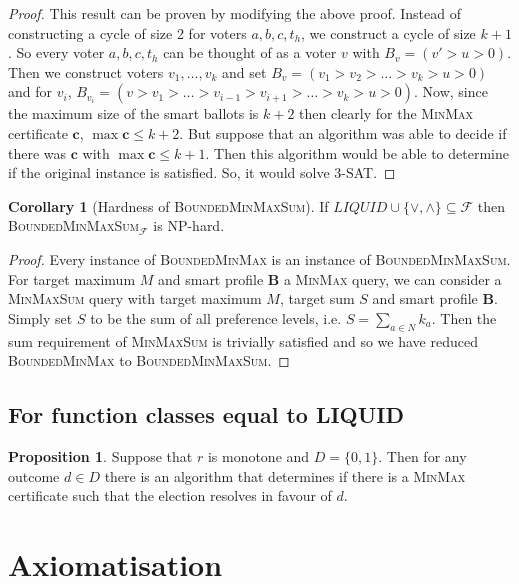 \documentclass[11pt,a4paper, titlepage]{article}
\theoremstyle{definition}
\newtheorem{corollary}[theorem]{Corollary}
\newtheorem{proposition}[theorem]{Proposition}
\let\vec\mathbf
\begin{document}
\begin{proof}
    This result can be proven by modifying the above proof. Instead of constructing a cycle of size 2 for voters $a, b, c, t_h$, we construct a cycle of size $k + 1$. So every voter $a, b, c, t_h$ can be thought of as a voter $v$ with $B_v = (v' > u > 0)$. Then we construct voters $v_1, \ldots, v_k$ and set $B_v = (v_1 > v_2 > \ldots > v_k > u > 0)$ and for $v_i$, $B_{v_i} = (v > v_1 > \ldots > v_{i - 1} > v_{i+1} > \ldots > v_k > u > 0)$.
    Now, since the maximum size of the smart ballots is $k + 2$ then clearly for the \textsc{MinMax} certificate $\vec{c}$, $\max{\vec{c}} \leq k + 2$. 
    But suppose that an algorithm was able to decide if there was $\vec{c}$ with $\max{\vec{c}} \leq k + 1$. Then this algorithm would be able to determine if the original instance is satisfied. So, it would solve \textsc{3-SAT}.
\end{proof}

\begin{corollary}[Hardness of \textsc{BoundedMinMaxSum}]
    If $ \mathit{LIQUID} \cup \{\lor, \land\} \subseteq \mathcal{F}$ then \textsc{BoundedMinMaxSum}$_\mathcal{F}$ is NP-hard. 
\end{corollary}

\begin{proof}
    Every instance of \textsc{BoundedMinMax} is an instance of \textsc{BoundedMinMaxSum}. For target maximum $M$ and smart profile $\vec{B}$ a \textsc{MinMax} query, we can consider a \textsc{MinMaxSum} query with target maximum $M$, target sum $S$ and smart profile $\vec{B}$. Simply set $S$ to be the sum of all preference levels, i.e. $S = \sum_{a \in N} k_a$. Then the sum requirement of \textsc{MinMaxSum} is trivially satisfied and so we have reduced \textsc{BoundedMinMax} to \textsc{BoundedMinMaxSum}.
\end{proof}

\subsection{For function classes equal to LIQUID}

\begin{proposition}
    Suppose that $r$ is monotone and $D = \{0, 1\}$. Then for any outcome $d \in D$ there is an algorithm that determines if there is a \textsc{MinMax} certificate such that the election resolves in favour of $d$.
\end{proposition}
\newpage
\section{Axiomatisation}
\end{document}
